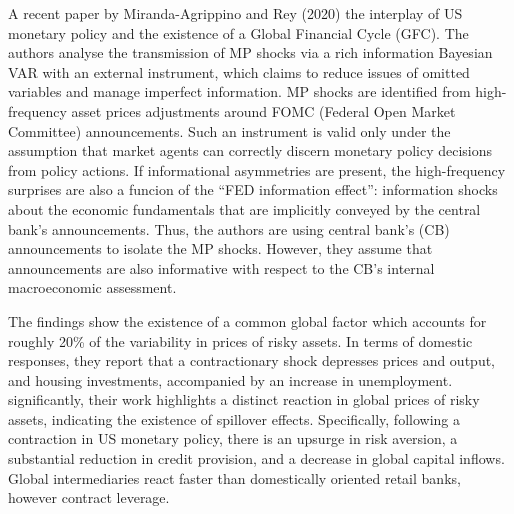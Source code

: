 \documentclass[11pt,a4paper]{article}
\begin{document}
A recent paper by Miranda-Agrippino and Rey (2020) the interplay of US monetary policy and the existence of a Global Financial Cycle (GFC). 
The authors analyse the transmission of MP shocks via a rich information Bayesian VAR with an external instrument, which claims to reduce issues of omitted variables and manage imperfect information. 
MP shocks are identified from high-frequency asset prices adjustments around FOMC (Federal Open Market Committee) announcements. 
Such an instrument is valid only under the assumption that market agents can correctly discern monetary policy decisions from policy actions. If informational asymmetries are present, the high-frequency surprises are also a funcion of the \enquote{FED information effect}: information shocks about the economic fundamentals that are implicitly conveyed by the central bank's announcements. 
Thus, the authors are using central bank's (CB) announcements to isolate the MP shocks. However, they assume that announcements are also informative with respect to the CB's internal macroeconomic assessment. 


The findings show the existence of a common global factor which accounts for roughly 20\% of the variability in prices of risky assets. 
In terms of domestic responses, they report that a contractionary shock depresses prices and output, and housing investments, accompanied by an increase in unemployment.
significantly, their work highlights a distinct reaction in global prices of risky assets, indicating the existence of spillover effects.
Specifically, following a contraction in US monetary policy, there is an upsurge in risk aversion, a substantial reduction in credit provision, and a decrease in global capital inflows. Global intermediaries react faster than domestically oriented retail banks, however contract leverage.
\end{document}
